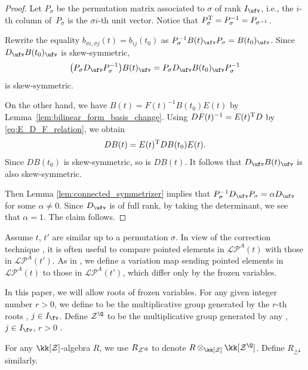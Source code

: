 \documentclass[pdftex]{sigma}
\newcommand{\Iufv}{I_{\ufv}}
\newcommand{\LP}{{\mathcal{LP}}}
\newcommand{\fFac}{\mathcal{Z}}
\newcommand{\fFacRoot}{\fFac^{\Q}}
\numberwithin{equation}{section}
\begin{document}
\begin{proof}
Let $P_{\sigma}$ be the permutation matrix associated to $\sigma$ of rank $\Iufv$, i.e., the $i$-th column of~$P_{\sigma}$ is the $\sigma i$-th unit vector. Notice that $P_{\sigma}^{\rm T}=P_{\sigma}^{-1}=P_{\sigma^{-1}}$.

Rewrite the equality $b_{\sigma i,\sigma j}(t)=b_{ij}(t_{0})$ as $P_{\sigma}^{-1}B(t)_{\ufv}P_{\sigma}=B(t_0)_{\ufv}$.
Since $D_{\ufv}B(t_0)_{\ufv}$ is skew-symmetric,
\[\big(P_{\sigma}D_{\ufv}P_{\sigma}^{-1}\big)B(t)_{\ufv}=P_{\sigma}D_{\ufv}B(t_0)_{\ufv}P_{\sigma}^{-1}\]
is skew-symmetric.

On the other hand, we have $B(t)=F(t)^{-1}B(t_{0})E(t)$ by Lemma~\ref{lem:bilinear_form_basis_change}. Using $DF(t)^{-1}=E(t)^{\rm T}D$
by \eqref{eq:E_D_F_relation}, we obtain
\[DB(t)=E(t)^{\rm T}DB(t_{0})E(t).\]
Since $DB(t_{0})$ is skew-symmetric, so is $DB(t)$. It follows that
$D_{\ufv}B(t)_{\ufv}$ is also skew-symmetric.

Then Lemma \ref{lem:connected_symmetrizer} implies that $P_{\sigma}^{-1}D_{\ufv}P_{\sigma}=\alpha D_{\ufv}$
for some $\alpha\neq0$. Since $D_{\ufv}$ is of full rank,
by taking the determinant, we see that $\alpha=1$. The claim follows.
\end{proof}

Assume $t$, $t'$ are similar up to a permutation $\sigma$. In view
of the correction technique \cite{Qin12}, it is often useful to compare
pointed elements in $\LP^A(t)$ with those in $\LP^A(t')$. As in \cite{qin2017triangular},
we define a variation map sending pointed elements in $\LP^A(t)$ to
those in $\LP^A(t')$, which differ only by the frozen variables.

In this paper, we will allow roots of frozen variables. For any given
integer number $r>0$, we define \smash{$\fFac^{\frac{1}{r}}$} to be the
multiplicative group generated by the $r$-th roots ,
$j\in I_{\fv}$. Define $\fFacRoot$ to be the multiplicative group
generated by any , $j\in I_{\fv}$, $r>0$
.

For any $\kk[\fFac]$-algebra $R$, we use $R_{\fFacRoot}$ to denote
$R\otimes_{\kk[\fFac]}\kk[\fFacRoot]$. Define $R_{\fFac^{\frac{1}{r}}}$
similarly.
\end{document}

